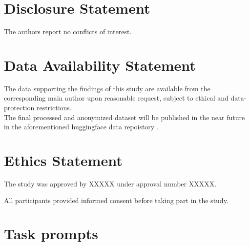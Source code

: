 \documentclass[english]{article}
\begin{document}
\section*{Disclosure Statement}

The authors report no conflicts of interest.

\section*{Data Availability Statement}

The data supporting the findings of this study are available from the corresponding main author upon reasonable request, subject to ethical and data-protection restrictions.
\\

The final processed and anonymized dataset will be published in the near future in the aforementioned huggingface data repoistory \cite{troiani2026priceofattentionraw}.

\section*{Ethics Statement}

The study was approved by XXXXX under approval number XXXXX.

All participants provided informed consent before taking part in the study.




\appendix

\section{Task prompts}
\label{app:task-prompts}
\end{document}
